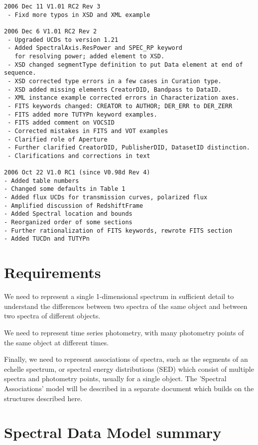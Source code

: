\documentclass[11pt]{article}
\begin{document}
\begin{verbatim}
2006 Dec 11 V1.01 RC2 Rev 3
 - Fixd more typos in XSD and XML example

2006 Dec 6 V1.01 RC2 Rev 2
 - Upgraded UCDs to version 1.21
 - Added SpectralAxis.ResPower and SPEC_RP keyword
   for resolving power; added element to XSD.
 - XSD changed segmentType definition to put Data element at end of sequence.
 - XSD corrected type errors in a few cases in Curation type.
 - XSD added missing elements CreatorDID, Bandpass to DataID.
 - XML instance example corrected errors in Characterization axes. 
 - FITS keywords changed: CREATOR to AUTHOR; DER_ERR to DER_ZERR  
 - FITS added more TUTYPn keyword examples.
 - FITS added comment on VOCSID
 - Corrected mistakes in FITS and VOT examples
 - Clarified role of Aperture
 - Further clarified CreatorDID, PublisherDID, DatasetID distinction.
 - Clarifications and corrections in text

2006 Oct 22 V1.0 RC1 (since V0.98d Rev 4)
- Added table numbers
- Changed some defaults in Table 1
- Added flux UCDs for transmission curves, polarized flux
- Amplified discussion of RedshiftFrame
- Added Spectral location and bounds
- Reorganized order of some sections
- Further rationalization of FITS keywords, rewrote FITS section
- Added TUCDn and TUTYPn

\end{verbatim}

\clearpage

\section{Requirements}

We need to represent a single 1-dimensional spectrum in sufficient
detail to understand the differences between two spectra of the same
object and between two spectra of different objects.

We need to represent time series photometry, with many photometry points
of the same object at different times.

Finally, we need to represent associations of spectra,
such as the segments of an echelle spectrum, or
spectral energy distributions (SED) which
consist of multiple spectra and photometry points, usually for a single
object. The 'Spectral Associations' model will be described in
a separate document which builds on the structures described here.

\section{Spectral Data Model summary}
\end{document}
